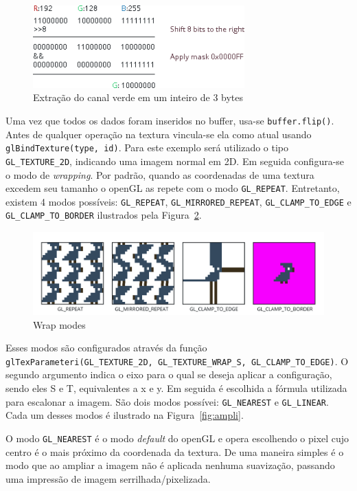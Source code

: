 \documentclass[12pt, 
openright, 
oneside, 
a4paper,    
brazil]{facom-ufu-abntex2}
\begin{document}
\begin{figure}[H]
	\centering
	\includegraphics[width=22em]{imagens/extracting_rgb_channel.png}
	\caption{Extração do canal verde em um inteiro de 3 bytes}
	\label{fig:extracaoCanalRGB}
\end{figure}

Uma vez que todos os dados foram inseridos no buffer, usa-se \texttt{buffer.flip()}. Antes de qualquer operação na textura vincula-se ela como atual usando \texttt{glBindTexture(type, id)}. Para este exemplo será utilizado o tipo \texttt{GL_TEXTURE_2D}, indicando uma imagem normal em 2D. Em seguida configura-se o modo de \textit{wrapping}. Por padrão, quando as coordenadas de uma textura excedem seu tamanho o openGL as repete com o modo \texttt{GL_REPEAT}. Entretanto, existem 4 modos possíveis: \texttt{GL_REPEAT}, \texttt{GL_MIRRORED_REPEAT}, \texttt{GL_CLAMP_TO_EDGE} e \texttt{GL_CLAMP_TO_BORDER} ilustrados pela Figura~\ref{fig:wrapModes}.
\begin{figure}[H]
	\centering
	\includegraphics[width=\textwidth]{imagens/wrap_modes.png}
	\caption{Wrap modes}
	\label{fig:wrapModes}
\end{figure}
Esses modos são configurados através da função \texttt{glTexParameteri(GL_TEXTURE_2D, GL_TEXTURE_WRAP_S, GL_CLAMP_TO_EDGE)}. O segundo argumento indica o eixo para o qual se deseja aplicar a configuração, sendo eles S e T, equivalentes a x e y. Em seguida é escolhida a fórmula utilizada para escalonar a imagem. São dois modos possívei: \texttt{GL_NEAREST} e \texttt{GL_LINEAR}. Cada um desses modos é ilustrado na Figura~\ref{fig:ampli}.

O modo \texttt{GL_NEAREST} é o modo \textit{default} do openGL e opera escolhendo o pixel cujo centro é o mais próximo da coordenada da textura. De uma maneira simples é o modo que ao ampliar a imagem não é aplicada nenhuma suavização, passando uma impressão de imagem serrilhada/pixelizada.
\end{document}
